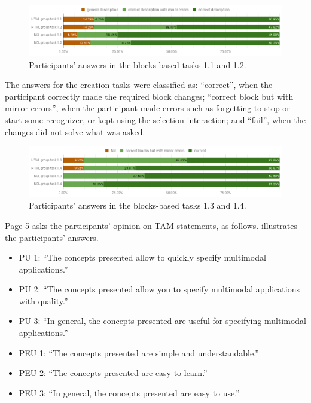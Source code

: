 \begin{figure}[!ht]
\begin{center}
	\includegraphics[width=14cm, keepaspectratio]{img/img20.png}
    \captionvspace
	\caption{Participants’ answers in the blocks-based tasks 1.1 and 1.2.}
	\label{fig:blocks-res1}
    \captionvspace
\end{center}
\end{figure}

The answers for the creation tasks were classified as: “correct”, when the
participant correctly made the required block changes; “correct block but with
mirror errors”, when the participant made errors such as forgetting to stop or
start some recognizer, or kept using the selection interaction; and “fail”, when
the changes did not solve what was asked.

\begin{figure}[!ht]
\begin{center}
	\includegraphics[width=14cm, keepaspectratio]{img/img21.png}
    \captionvspace
	\caption{Participants’ answers in the blocks-based tasks 1.3 and 1.4.}
	\label{fig:blocks-res2}
    \captionvspace
\end{center}
\end{figure}

Page 5 asks the participants’ opinion on TAM statements, as follows.
 illustrates the participants’ answers.

\begin{itemize}
	\item PU 1: “The concepts presented allow to quickly specify multimodal
	applications.”
	\item PU 2: “The concepts presented allow you to specify multimodal
	applications with quality.”
	\item PU 3: “In general, the concepts presented are useful for specifying
	multimodal applications.”
	\item PEU 1: “The concepts presented are simple and understandable.”
	\item PEU 2: “The concepts presented are easy to learn.”
	\item PEU 3: “In general, the concepts presented are easy to use.”
\end{itemize}

